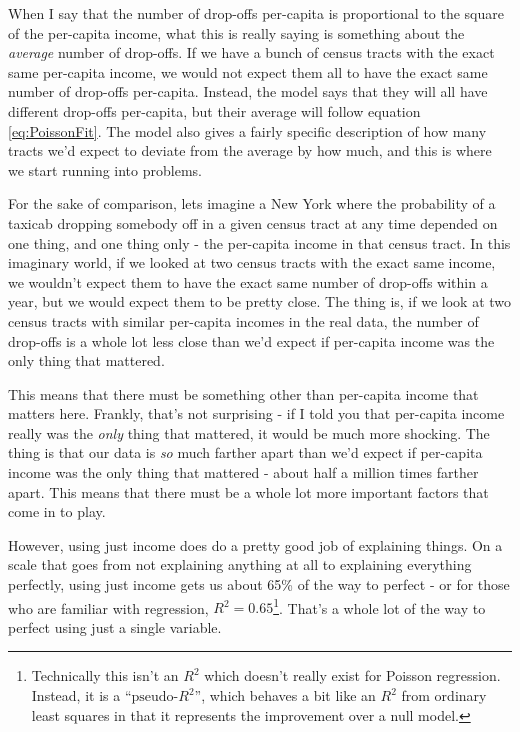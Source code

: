 \documentclass[11pt]{article}
\begin{document}
When I say that the number of drop-offs per-capita is proportional to the square of the per-capita income, what this is really saying is something about the {\it average} number of drop-offs.
If we have a bunch of census tracts with the exact same per-capita income, we would not expect them all to have the exact same number of drop-offs per-capita.
Instead, the model says that they will all have different drop-offs per-capita, but their average will follow equation \ref{eq:PoissonFit}.
The model also gives a fairly specific description of how many tracts we'd expect to deviate from the average by how much, and this is where we start running into problems.

For the sake of comparison, lets imagine a New York where the probability of a taxicab dropping somebody off in a given census tract at any time depended on one thing, and one thing only - the per-capita income in that census tract.
In this imaginary world, if we looked at two census tracts with the exact same income, we wouldn't expect them to have the exact same number of drop-offs within a year, but we would expect them to be pretty close.
The thing is, if we look at two census tracts with similar per-capita incomes in the real data, the number of drop-offs is a whole lot less close than we'd expect if per-capita income was the only thing that mattered.

This means that there must be something other than per-capita income that matters here.
Frankly, that's not surprising - if I told you that per-capita income really was the {\it only} thing that mattered, it would be much more shocking.
The thing is that our data is {\it so} much farther apart than we'd expect if per-capita income was the only thing that mattered - about half a million times farther apart.
This means that there must be a whole lot more important factors that come in to play.

However, using just income does do a pretty good job of explaining things.
On a scale that goes from not explaining anything at all to explaining everything perfectly, using just income gets us about 65\% of the way to perfect - or for those who are familiar with regression, $R^2=0.65$\footnote{Technically this isn't an $R^2$ which doesn't really exist for Poisson regression. Instead, it is a ``$\mbox{pseudo-}R^2$'', which behaves a bit like an $R^2$ from ordinary least squares in that it represents the improvement over a null model. }.
That's a whole lot of the way to perfect using just a single variable.
\end{document}
